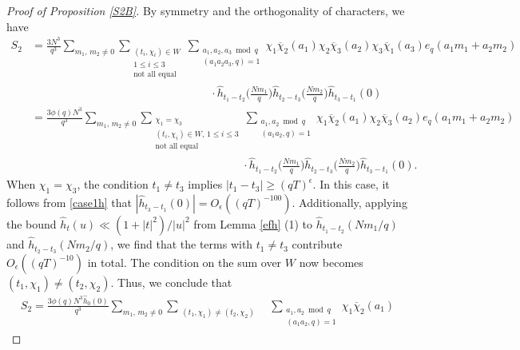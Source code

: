 \documentclass[12pt]{amsart}
\theoremstyle{definition}
\theoremstyle{plain}
\theoremstyle{remark}
\numberwithin{equation}{section}
\numberwithin{theorem}{section}
\numberwithin{equation}{section}
\begin{document}
	\vspace{1 pt}
	\begin{proof}[Proof of Proposition \ref{S2B}]
		By symmetry and the orthogonality of characters, we have
		\begin{align*}
			S_{2}&=\frac{3N^{3}}{q^{3}}\sum_{m_{1},\, m_{2}\neq 0}\sum_{\substack{(t_{i}, \chi_{i})\in W \\ 1\leq i \leq 3 \\ \text{not all equal}}}\sum_{\substack{a_1,a_2,a_3 \bmod q \\ (a_1a_2a_3,q)=1}}\chi_{1}\overline{\chi}_{2}(a_{1})
			\chi_{2}\overline{\chi}_{3}(a_{2})
			\chi_{3}\overline{\chi}_{1}(a_{3})e_q(a_1m_1+a_2m_2)
			\\
			&\quad\quad\quad\quad\quad\quad\quad\quad\quad\quad\quad\quad\quad\quad\quad\quad  \cdot\hat{h}_{t_{1}-t_{2}}\bigg(\frac{Nm_{1}}{q}\bigg)\hat{h}_{t_{2}-t_{3}}\bigg(\frac{Nm_{2}}{q}\bigg)\hat{h}_{t_{3}-t_{1}}(0)
			\\
			&=\frac{3\phi(q)N^{3}}{q^{3}}\sum_{m_{1},\, m_{2}\neq 0}\sum_{\substack{\chi_{1}=\chi_{3} \\ (t_{i}, \chi_{i})\in W, \,1\leq i \leq 3 \\ \text{not all equal}}}\sum_{\substack{a_1,a_2 \bmod q \\ (a_1a_2,q)=1}}\chi_{1}\overline{\chi}_{2}(a_{1})
			\chi_{2}\overline{\chi}_{3}(a_{2}) e_q(a_1m_1+a_2m_2)
			\\
			&\quad\quad\quad\quad\quad\quad\quad\quad\quad\quad\quad\quad\quad\quad\quad\quad\phantom{abcdef}\cdot\hat{h}_{t_{1}-t_{2}}\bigg(\frac{Nm_{1}}{q}\bigg)\hat{h}_{t_{2}-t_{3}}\bigg(\frac{Nm_{2}}{q}\bigg)\hat{h}_{t_{3}-t_{1}}(0).
		\end{align*}
		When $\chi_{1}=\chi_{3}$, the condition $t_{1}\neq t_{3}$ implies $|t_{1}-t_{3}|\geq (qT)^{\epsilon}$. In this case, it follows from \eqref{case1h} that  $|\hat{h}_{t_{3}-t_{1}}(0)|=O_{\epsilon}((qT)^{-100})$. Additionally, applying the bound $\hat{h}_{t}(u)\ll (1+|t|^{2})/|u|^{2}$ from Lemma \ref{efh} (1) to $\hat{h}_{t_{1}-t_{2}}(Nm_{1}/q)$ and $\hat{h}_{t_{2}-t_{3}}(Nm_{2}/q)$, we find that the terms with $t_{1}\neq t_{3}$ contribute $O_{\epsilon}((qT)^{-10})$ in total. The condition on the sum over $W$ now becomes $(t_1,\chi_1) \neq (t_2,\chi_2)$. Thus, we conclude that
		\begin{align*}
			S_{2}=\frac{3\phi(q)N^{3}\hat{h}_{0}(0)}{q^{3}}\sum_{m_{1},\, m_{2}\neq 0}\sum_{\substack{(t_1,\chi_1) \neq (t_2,\chi_2) }}&\sum_{\substack{a_1,a_2 \bmod q \\ (a_1a_2,q)=1}}\chi_{1}\overline{\chi}_{2}(a_{1})

\end{align*}
\end{proof}
\end{document}
